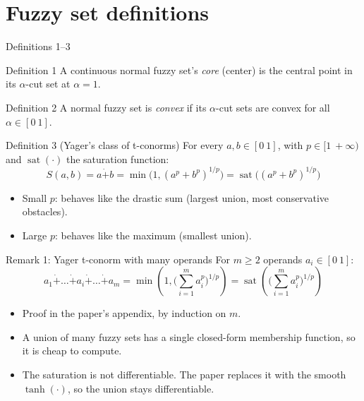 \documentclass[9pt,aspectratio=169]{beamer}
\newcommand{\ysum}{\mathbin{\dot{+}}}
\newcommand{\sat}{\operatorname{sat}}
\begin{document}
\section{Fuzzy set definitions}
\begin{frame}{Definitions 1--3}
\begin{block}{Definition 1}
A continuous normal fuzzy set's \emph{core} (center) is the central point in its $\alpha$-cut set at $\alpha=1$.
\end{block}
\begin{block}{Definition 2}
A normal fuzzy set is \emph{convex} if its $\alpha$-cut sets are convex for all $\alpha\in[0\ 1]$.
\end{block}
\begin{block}{Definition 3 (Yager's class of t-conorms)}
For every $a,b\in[0\ 1]$, with $p\in[1\ +\infty)$ and $\sat(\cdot)$ the saturation function:
\[
S(a,b)=a\ysum b=\min\!\Big(1,(a^p+b^p)^{1/p}\Big)=\sat\!\Big((a^p+b^p)^{1/p}\Big)\tag{1}
\]
\end{block}
\begin{itemize}
  \item Small $p$: behaves like the drastic sum (largest union, most conservative obstacles).
  \item Large $p$: behaves like the maximum (smallest union).
\end{itemize}
\end{frame}

\begin{frame}{Remark 1: Yager t-conorm with many operands}
For $m\ge2$ operands $a_i\in[0\ 1]$:
\[
a_1\ysum\dots\ysum a_i\ysum\dots\ysum a_m=\min\!\left(1,\Big(\sum_{i=1}^m a_i^p\Big)^{1/p}\right)=\sat\!\left(\Big(\sum_{i=1}^m a_i^p\Big)^{1/p}\right)\tag{7}
\]
\begin{itemize}
  \item Proof in the paper's appendix, by induction on $m$.
  \item A union of many fuzzy sets has a single closed-form membership function, so it is cheap to compute.
  \item The saturation is not differentiable. The paper replaces it with the smooth $\tanh(\cdot)$, so the union stays differentiable.
\end{itemize}
\end{frame}

\end{document}

